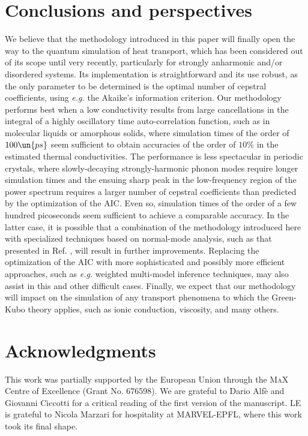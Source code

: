 \section{Conclusions and perspectives} \label{sec:conclusions}
We believe that the methodology introduced in this paper will finally open the way to the quantum simulation of heat transport, which has been considered out of its scope until very recently, particularly for strongly anharmonic and/or disordered systems. Its implementation is straightforward and its use robust, as the only parameter to be determined is the optimal number of cepstral coefficients, using \emph{e.g.} the Akaike's information criterion. Our methodology performs best when a low conductivity results from large cancellations in the integral of a highly oscillatory time auto-correlation function, such as in molecular liquids or amorphous solids, where simulation times of the order of $100\un{ps}$ seem sufficient to obtain accuracies of the order of $10\%$ in the estimated thermal conductivities. The performance is less spectacular in periodic crystals, where slowly-decaying strongly-harmonic phonon modes require longer simulation times and the ensuing sharp peak in the low-frequency region of the power spectrum requires a larger number of cepstral coefficients than predicted by the optimization of the AIC. Even so, simulation times of the order of a few hundred picoseconds seem sufficient to achieve a comparable accuracy. In the latter case, it is possible that a combination of the methodology introduced here with specialized techniques based on normal-mode analysis, such as that presented in Ref. , will result in further improvements. Replacing the optimization of the AIC with more sophisticated and possibly more efficient approaches, such as \emph{e.g.} weighted multi-model inference techniques,\cite{Burnham2004,Claeskens2008} may also assist in this and other difficult cases. Finally, we expect that our methodology will impact on the simulation of any transport phenomena to which the Green-Kubo theory applies, such as ionic conduction, viscosity, and many others.

\section*{Acknowledgments}
This work was partially supported by the European Union through the \textsc{MaX} Centre of Excellence (Grant No. 676598). We are grateful to Dario Alf\`e and Giovanni Ciccotti for a critical reading of the first version of the manuscript. LE is grateful to Nicola Marzari for hospitality at MARVEL-EPFL, where this work took its final shape.

